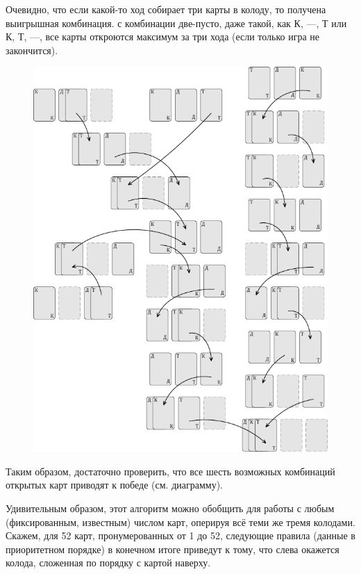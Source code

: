 \documentclass[twoside]{book}
\begin{document}
Очевидно, что если какой-то ход собирает три карты в колоду, то получена выигрышная комбинация.
 с комбинации две-пусто, даже такой, как К, ---, Т или
К, Т, ---, все карты откроются максимум за три хода (если только игра не закончится).
\begin{figure}[!ht]
\centering
 \includegraphics{mp/wink-24}
\end{figure}
Таким образом, достаточно проверить, что все шесть возможных комбинаций открытых карт приводят к победе  (см. диаграмму).
\heart

Удивительным образом, этот алгоритм можно обобщить для работы с любым (фиксированным, известным) числом карт, оперируя всё теми же тремя колодами.
Скажем, для 52 карт, пронумерованных  от 1 до 52, следующие правила (данные в приоритетном порядке) в конечном итоге приведут к тому, что слева окажется колода, сложенная по порядку с  картой наверху.
\end{document}
